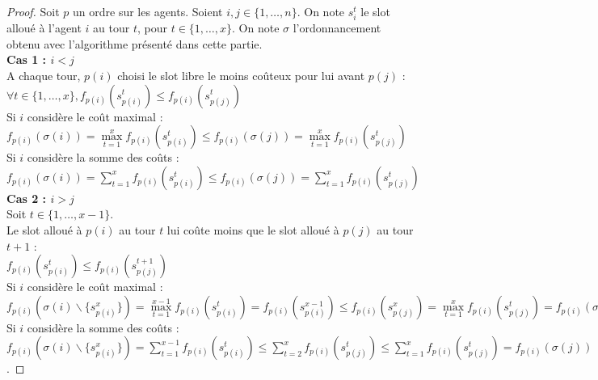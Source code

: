 \documentclass[12pt]{article}
\theoremstyle{definition}
\begin{document}
\begin{proof}
Soit $p$ un ordre sur les agents. Soient $i, j \in \{1, \dots, n\}$. On note $s_i^t$ le slot alloué à l'agent $i$ au tour $t$, pour $t\in\{1,\dots,x\}$. On note $\sigma$ l'ordonnancement obtenu avec l'algorithme présenté dans cette partie.\\
\textbf{Cas 1 : $i<j$}\\
A chaque tour, $p(i)$ choisi le slot libre le moins coûteux pour lui avant $p(j)$ :\\
 $\forall t\in \{1, \dots, x\}, f_{p(i)}(s^t_{p(i)})\leq f_{p(i)}(s^t_{p(j)})$\\
 Si $i$ considère le coût maximal : $f_{p(i)}(\sigma(i)) = \max\limits_{t = 1}^x f_{p(i)}(s^t_{p(i)}) \leq f_{p(i)}(\sigma(j)) = \max\limits_{t = 1}^x f_{p(i)}(s^t_{p(j)})$\\
 Si $i$ considère la somme des coûts : $f_{p(i)}(\sigma(i)) = \sum\limits_{t = 1}^x f_{p(i)}(s^t_{p(i)})\leq f_{p(i)}(\sigma(j)) = \sum\limits_{t = 1}^x f_{p(i)}(s^t_{p(j)})$\\
\textbf{Cas 2 : $i>j$}\\
Soit $t\in\{1,\dots,x-1\}$.\\
Le slot alloué à $p(i)$ au tour $t$ lui coûte moins que le slot alloué à $p(j)$ au tour $t+1$ : \\
$f_{p(i)}(s^t_{p(i)})\leq f_{p(i)}(s^{t+1}_{p(j)})$\\
Si $i$ considère le coût maximal : \\
$f_{p(i)}(\sigma(i)\backslash\{s_{p(i)}^x\}) = \max\limits_{t = 1}^{x-1} f_{p(i)}(s^t_{p(i)}) = f_{p(i)}(s^{x-1}_{p(i)}) \leq f_{p(i)}(s^x_{p(j)}) = \max\limits_{t = 1}^{x} f_{p(i)}(s^t_{p(j)}) = f_{p(i)}(\sigma(j))$\\
Si $i$ considère la somme des coûts : \\
$f_{p(i)}(\sigma(i)\backslash\{s_{p(i)}^x\}) = \sum\limits_{t = 1}^{x-1} f_{p(i)}(s^t_{p(i)}) \leq \sum\limits_{t = 2}^{x} f_{p(i)}(s^t_{p(j)}) \leq \sum\limits_{t = 1}^{x} f_{p(i)}(s^t_{p(j)}) = f_{p(i)}(\sigma(j))$.
\end{proof}

\newpage


\end{document}
